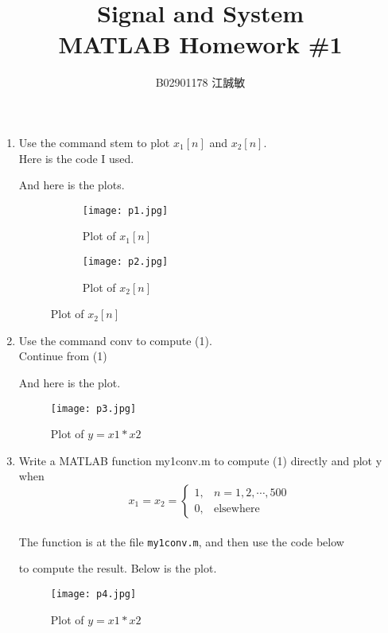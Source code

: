 \documentclass[12pt, a4paper]{article}
\title{ \bf {\Huge Signal and System}\\ MATLAB Homework \#1}
\author{B02901178 江誠敏}
\begin{document}
\maketitle

\begin{enumerate}
  \item Use the command stem to plot $x_1[n]$ and $x_2[n]$. \\[12pt]
    Here is the code I used.
    
    And here is the plots.

    \begin{figure}[H]
      \begin{subfigure}{0.45\textwidth}
        \centering
        \texttt{[image: p1.jpg]}
        \caption{Plot of $x_1[n]$}
      \end{subfigure}
      \begin{subfigure}{0.45\textwidth}
        \centering
        \texttt{[image: p2.jpg]}
        \caption{Plot of $x_2[n]$}
      \end{subfigure}
    \end{figure}
  \item Use the command conv to compute (1). \\[12pt]
    Continue from (1)
    
    And here is the plot.
    \begin{center}
    \begin{figure}[H]
      \centering
      \texttt{[image: p3.jpg]}
      \caption{Plot of $y = x1 * x2$}
    \end{figure}
    \end{center}

  \item Write a MATLAB function my1conv.m to compute (1) directly and plot y when
    \[ x_1 = x_2 = \begin{cases}
        1, & n = 1, 2, \cdots, 500 \\
        0, & \text{elsewhere}
    \end{cases} \]
    \\[12pt]
    The function is at the file \texttt{my1conv.m}, and then use the code below
    
    to compute the result. Below is the plot.
    \begin{center}
    \begin{figure}[H]
      \centering
      \texttt{[image: p4.jpg]}
      \caption{Plot of $y = x1 * x2$}
    \end{figure}
    \end{center}


\end{enumerate}
\end{document}
